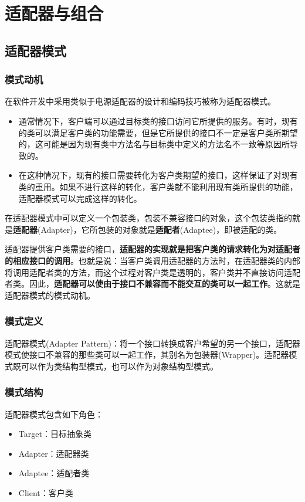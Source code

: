 \section{适配器与组合}

\subsection{适配器模式}

\subsubsection{模式动机}
在软件开发中采用类似于电源适配器的设计和编码技巧被称为适配器模式。
\begin{itemize}
    \item 通常情况下，客户端可以通过目标类的接口访问它所提供的服务。有时，现有的类可以满足客户类的功能需要，但是它所提供的接口不一定是客户类所期望的，这可能是因为现有类中方法名与目标类中定义的方法名不一致等原因所导致的。
    \item 在这种情况下，现有的接口需要转化为客户类期望的接口，这样保证了对现有类的重用。如果不进行这样的转化，客户类就不能利用现有类所提供的功能，适配器模式可以完成这样的转化。
\end{itemize}

在适配器模式中可以定义一个包装类，包装不兼容接口的对象，这个包装类指的就是\textbf{适配器}(Adapter)，它所包装的对象就是\textbf{适配者}(Adaptee)，即被适配的类。

适配器提供客户类需要的接口，\textbf{适配器的实现就是把客户类的请求转化为对适配者的相应接口的调用}。也就是说：当客户类调用适配器的方法时，在适配器类的内部将调用适配者类的方法，而这个过程对客户类是透明的，客户类并不直接访问适配者类。因此，\textbf{适配器可以使由于接口不兼容而不能交互的类可以一起工作}。这就是适配器模式的模式动机。

\subsubsection{模式定义}
适配器模式(Adapter Pattern)：将一个接口转换成客户希望的另一个接口，适配器模式使接口不兼容的那些类可以一起工作，其别名为包装器(Wrapper)。适配器模式既可以作为类结构型模式，也可以作为对象结构型模式。

\subsubsection{模式结构}
适配器模式包含如下角色：
\vspace{-0.8em}
\begin{multicols}{2}
    \begin{itemize}
        \item Target：目标抽象类
        \item Adapter：适配器类
        \item Adaptee：适配者类
        \item Client：客户类
    \end{itemize}
\end{multicols}
\vspace{-1em}

